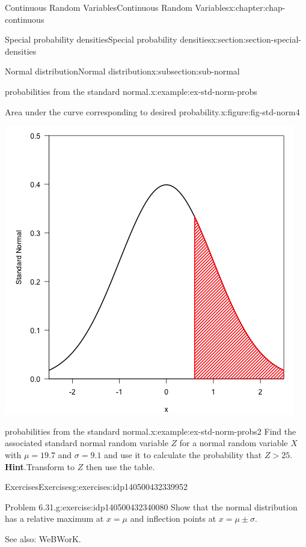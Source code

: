 \documentclass[oneside,10pt,]{book}
\newcommand{\blocktitlefont}{\relax}
\newcommand{\gt}{>}
\begin{document}
\begin{chapterptx}{Continuous Random Variables}{}{Continuous Random Variables}{}{}{x:chapter:chap-continuous}
\begin{sectionptx}{Special probability densities}{}{Special probability densities}{}{}{x:section:section-special-densities}
\begin{subsectionptx}{Normal distribution}{}{Normal distribution}{}{}{x:subsection:sub-normal}
\begin{example}{probabilities from the standard normal.}{x:example:ex-std-norm-probs}
\begin{figureptx}{Area under the curve corresponding to desired probability.}{x:figure:fig-std-norm4}{}
\begin{image}{0.25}{0.5}{0.25}
\includegraphics[width=\linewidth]{./images/std_norm4.png}
\end{image}%
\tcblower
\end{figureptx}%
\end{example}
\begin{example}{probabilities from the standard normal.}{x:example:ex-std-norm-probs2}%
Find the associated standard normal random variable \(Z\) for a normal random variable \(X\) with \(\mu = 19.7\) and \(\sigma = 9.1\) and use it to calculate the probability that \(Z \gt 25\).%
\textbf{\blocktitlefont Hint}.\quad{}Transform to \(Z\) then use the table.%
\end{example}
%
%
\typeout{************************************************}
\typeout{************************************************}
%
\begin{exercises-subsubsection}{Exercises}{}{Exercises}{}{}{g:exercises:idp140500432339952}
\begin{divisionexercise}{1}{Problem 6.31.}{}{g:exercise:idp140500432340080}%
Show that the normal distribution has a relative maximum at \(x =
\mu\) and inflection points at \(x = \mu \pm \sigma\).%
\end{divisionexercise}%
See also: WeBWorK.%
\end{exercises-subsubsection}
\end{subsectionptx}

\end{sectionptx}
\end{chapterptx}
\end{document}
